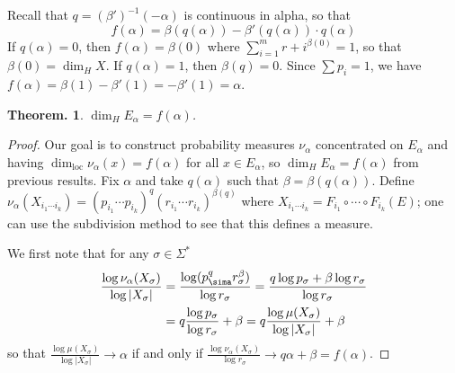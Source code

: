 \documentclass[11pt, a4paper]{memoir}
\theoremstyle{change}
\newtheorem{theorem}{Theorem.}[section]
\theoremstyle{plain}
\theoremstyle{nonumberplain}
\newtheorem{proof}{Proof}
\DeclareMathOperator{\loc}{loc}
\numberwithin{equation}{section}
\begin{document}
Recall that $q=(\beta')^{-1}(-\alpha)$ is continuous in alpha, so that
\begin{equation*}
    f(\alpha)=\beta(q(\alpha))-\beta'(q(\alpha))\cdot q(\alpha)
\end{equation*}
If $q(\alpha)=0$, then $f(\alpha)=\beta(0)$ where $\sum_{i=1}^mr+i^{\beta(0)}=1$, so that $\beta(0)=\dim_H X$.
If $q(\alpha)=1$, then $\beta(q)=0$.
Since $\sum p_i=1$, we have $f(\alpha)=\beta(1)-\beta'(1)=-\beta'(1)=\alpha$.
\begin{theorem}
    $\dim_H E_\alpha=f(\alpha)$.
\end{theorem}
\begin{proof}
    Our goal is to construct probability measures $\nu_\alpha$ concentrated on $E_\alpha$ and having $\dim_{\loc}\nu_\alpha(x)=f(\alpha)$ for all $x\in E_\alpha$, so $\dim_H E_\alpha=f(\alpha)$ from previous results.
    Fix $\alpha$ and take $q(\alpha)$ such that $\beta=\beta(q(\alpha))$.
    Define $\nu_\alpha(X_{i_1\cdots i_k})=(p_{i_1}\cdots p_{i_k})^q(r_{i_1}\cdots r_{i_k})^{\beta(q)}$ where $X_{i_1\cdots i_k}=F_{i_1}\circ\cdots\circ F_{i_k}(E)$; one can use the subdivision method to see that this defines a measure.

    We first note that for any $\sigma\in\Sigma^*$
    \begin{align*}
        \frac{\log\nu_\alpha(X_\sigma)}{\log|X_\sigma|}&=\frac{\log(p_\sima^qr_\sigma^\beta)}{\log r_\sigma}=\frac{q\log p_\sigma+\beta\log r_\sigma}{\log r_\sigma}\\
                                                       &= q\frac{\log p_\sigma}{\log r_\sigma}+\beta=q\frac{\log \mu(X_\sigma)}{\log|X_\sigma|}+\beta
    \end{align*}
    so that $\frac{\log\mu(X_\sigma)}{\log|X_\sigma|}\to\alpha$ if and only if $\frac{\log\nu_\alpha(X_\sigma)}{\log r_\sigma}\to q\alpha+\beta=f(\alpha)$.


\end{proof}
\end{document}
